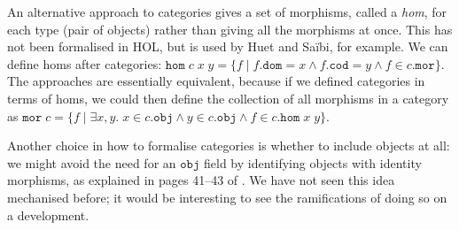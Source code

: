 \documentclass[twoside,titlepage,11pt]{article}
\begin{document}
An alternative approach to categories gives a set of morphisms, called a \emph{hom}, for each type (pair of objects) rather than giving all the morphisms at once.
This has not been formalised in HOL, but is used by Huet and Sa{\"i}bi, for example.
We can define homs after categories: $\mathtt{hom}\;c\;x\;y=\{f\mid f.\mathtt{dom}=x\land f.\mathtt{cod}=y\land f\in c.\mathtt{mor}\}$.
The approaches are essentially equivalent, because if we defined categories in terms of homs, we could then define the collection of all morphisms in a category as $\mathtt{mor}\;c=\{f\mid\exists{x,y}.\;x\in c.\mathtt{obj}\land y\in c.\mathtt{obj}\land f\in c.\mathtt{hom}\;x\;y\}$.

Another choice in how to formalise categories is whether to include objects at all: we might avoid the need for an $\mathtt{obj}$ field by identifying objects with identity morphisms, as explained in pages 41--43 of \cite{DBLP:books/daglib/0023249}.
We have not seen this idea mechanised before; it would be interesting to see the ramifications of doing so on a development.
\end{document}
